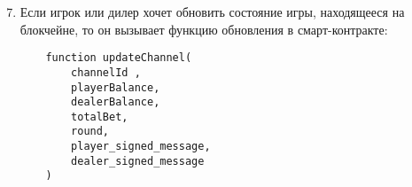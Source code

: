 \begin{algorithm}
\begin{enumerate}
\setcounter{enumi}{6}
 \item Если игрок или дилер хочет обновить состояние игры, находящееся на блокчейне, то он вызывает функцию обновления в смарт-контракте:
\begin{lstlisting}
    function updateChannel(
        channelId ,
        playerBalance,
        dealerBalance,
        totalBet,
        round,
        player_signed_message,
        dealer_signed_message
    )
\end{lstlisting}
\end{enumerate}
\end{algorithm}

